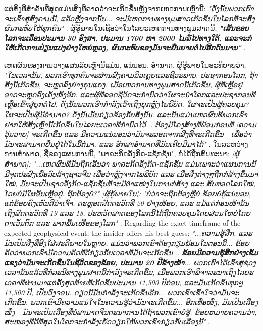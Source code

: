 \documentclass[10pt,twocolumn,letterpaper]{article}
\begin{document}
ແຕ່ສິ່ງທີ່ສຳຄັນທີ່ສຸດແມ່ນສິ່ງທີ່ຄາດວ່າຈະເກີດຂຶ້ນຫຼັງຈາກເຫດການເຫຼົ່ານີ້: \textit{"ດັ່ງນັ້ນພວກເຮົາຈະເຂົ້າສູ່ສົງຄາມນີ້, ແລ້ວຫຼັງຈາກນັ້ນ... ຈະມີເຫດການທາງພູມສາດເກີດຂຶ້ນໃນໂລກທີ່ຈະສົ່ງຜົນກະທົບໃຫ້ທຸກຄົນ"} \cite{4}. ຜູ້ຮູ້ພາຍໃນເຊື່ອວ່າໃນໄລຍະເຫດການທາງພູມສາດນີ້, \textit{\textbf{"ເສັ້ນຂອບໂລກຈະເລື່ອນປະມານ 30 ອົງສາ, ປະມານ 1700 ຫາ 2000 ໄມລ໌ໄປທາງໃຕ້, ແລະຈະກໍ່ໃຫ້ເກີດການປ່ຽນແປງຢ່າງໃຫຍ່ຫຼວງ, ຜົນກະທົບຂອງມັນຈະຍືນຍາຍຕໍ່ໄປອີກດົນນານ"}} \cite{4}.

ເຫດຜົນຂອງການວາງແຜນລັບເຫຼົ່ານີ້ແມ່ນ, ແນ່ນອນ, ອຳນາດ. ຜູ້ຮູ້ພາຍໃນອະທິບາຍວ່າ, \textit{"ໃນເວລານັ້ນ, ພວກເຮົາທຸກຄົນຈະຜ່ານສົງຄາມນິວເຄຼຍແລະຊີວະພາບ. ປະຊາກອນໂລກ, ຖ້າສິ່ງນີ້ເກີດຂຶ້ນ, ຈະຫຼຸດລົງຢ່າງຮຸນແຮງ. ເມື່ອເຫດການທາງພູມສາດນີ້ເກີດຂຶ້ນ, ຜູ້ທີ່ເຫຼືອຢູ່ອາດຈະຫຼຸດລົງເຄິ່ງໜຶ່ງອີກ. ແລະຜູ້ທີ່ລອດຊີວິດຈະກຳນົດວ່າໃຜຈະນຳໂລກແລະປະຊາກອນທີ່ເຫຼືອເຂົ້າສູ່ຍຸກຕໍ່ໄປ. ດັ່ງນັ້ນພວກເຮົາກຳລັງເວົ້າເຖິງຍຸກຫຼັງໄພພິບັດ. ໃຜຈະເປັນຜູ້ຄວບຄຸມ? ໃຜຈະເປັນຜູ້ມີອຳນາດ? ດັ່ງນັ້ນມັນກ່ຽວຂ້ອງກັບສິ່ງນັ້ນ. ແລະນັ້ນແມ່ນເຫດຜົນທີ່ພວກເຂົາຢາກໃຫ້ສິ່ງເຫຼົ່ານີ້ເກີດຂຶ້ນໃນໄລຍະເວລາທີ່ກຳນົດໄວ້... ຕ້ອງມີໂຄງສ້າງທີ່ພ້ອມກ່ອນທີ່ [ຄວາມວຸ້ນວາຍ] ຈະເກີດຂຶ້ນ ແລະ ມີຄວາມແນ່ນອນວ່າມັນຈະລອດຈາກສິ່ງທີ່ຈະເກີດຂຶ້ນ - ເພື່ອວ່າມັນຈະສາມາດຢືນຢູ່ໄດ້ໃນມື້ຕໍ່ມາ, ແລະ ຮັກສາອຳນາດທີ່ມັນເຄີຍມີມາໄດ້"} \cite{4}. ໃນລະຫວ່າງການສຳພາດ, ຊື່ຂອງແຜນການນີ້, "ພາລະກິດອັງກິດ-ແຊັກຊັນ", ກໍ່ໄດ້ຖືກສົນທະນາ: \textit{[ຜູ້ສຳພາດ]: "...ເຫດຜົນທີ່ມັນຖືກເອີ້ນວ່າ ພາລະກິດອັງກິດ-ແຊັກຊັນ ແມ່ນເພາະວ່າແຜນການນີ້ມີຈຸດປະສົງເພື່ອລົບລ້າງຊາວຈີນ ເພື່ອວ່າຫຼັງຈາກໄພພິບັດ ແລະ ເມື່ອສິ່ງຕ່າງໆຖືກກໍ່ສ້າງຂຶ້ນມາໃໝ່, ມັນຈະເປັນຊາວອັງກິດ-ແຊັກຊັນທີ່ຈະມີຕຳແໜ່ງໃນການກໍ່ສ້າງ ແລະ ສືບທອດໂລກໃໝ່, ໂດຍບໍ່ມີໃຜອື່ນເຫຼືອຢູ່. ຖືກຕ້ອງບໍ?" [ຜູ້ຮູ້ພາຍໃນ]: "ບໍ່ວ່າຈະຖືກຕ້ອງຫຼືບໍ່ ຂ້ອຍບໍ່ຮູ້ແນ່ນອນ, ແຕ່ຂ້ອຍຄົງເຫັນດີນຳເຈົ້າ. ຕະຫຼອດສັດຕະວັດທີ 20 ຢ່າງໜ້ອຍ, ແລະ ແມ້ແຕ່ກ່ອນໜ້ານັ້ນເຖິງສັດຕະວັດທີ 19 ແລະ 18, ປະຫວັດສາດຂອງໂລກນີ້ໄດ້ຖືກຄວບຄຸມໂດຍສ່ວນໃຫຍ່ໂດຍຕາເວັນຕົກ ແລະ ພາກພື້ນເໜືອຂອງໂລກ"} \cite{4}.
Regarding the exact timeframe of the expected geophysical event, the insider offers his best guess: \textit{"...ຄວາມຮູ້ສຶກ, ແລະມັນເປັນສິ່ງທີ່ອີງໃສ່ສະຕິພາຍໃນຫຼາຍ, ແມ່ນວ່າພວກເຂົາຕ້ອງກຽມພ້ອມໃນຕອນນີ້... ຂ້ອຍຄິດວ່າພວກເຂົາມີຄວາມຄິດທີ່ດີກ່ຽວກັບເວລາທີ່ມັນຈະເກີດຂຶ້ນ... \textbf{ຂ້ອຍມີຄວາມຮູ້ສຶກຢ່າງເຂັ້ມແຂງວ່າມັນຈະເກີດຂຶ້ນໃນຊີວິດຂອງຂ້ອຍ, ປະມານ 20 ປີຂ້າງໜ້າ}... ພວກເຮົາໄດ້ເຂົ້າສູ່ຊ່ວງເວລານັ້ນແລ້ວທີ່ກໍລະນີທາງພູມສາດນີ້ກຳລັງຈະເກີດຂຶ້ນ, ເມື່ອພວກເຮົາພິຈາລະນາເຖິງໄລຍະເວລາທີ່ຜ່ານມາແຕ່ຄັ້ງສຸດທ້າຍທີ່ເກີດຂຶ້ນປະມານ 11,500 ປີກ່ອນ, ແລະມັນເກີດຂຶ້ນທຸກໆ 11,500 ປີ, ເປັນວົງຈອນ. ດຽວນີ້ມັນກຳລັງຈະເກີດຂຶ້ນອີກ... ພວກເຂົາເຂົ້າໃຈວ່າມັນຈະເກີດຂຶ້ນ. ພວກເຂົາມີຄວາມແນ່ໃຈໃນຄວາມຮູ້ວ່າມັນຈະເກີດຂຶ້ນ... ອີກເທື່ອໜຶ່ງ, ມັນເປັນເລື່ອງໜຶ່ງ - ມັນຈະເປັນເລື່ອງທີ່ບໍ່ສາມາດຈິນຕະນາການໄດ້ຖ້າພວກເຂົາບໍ່ຮູ້. ຂ້ອຍຫມາຍຄວາມວ່າ, ສະໝອງທີ່ດີທີ່ສຸດໃນໂລກຈະກຳລັງເຮັດວຽກໃຫ້ພວກເຂົາກ່ຽວກັບເລື່ອງນີ້"} \cite{4}.
\end{document}
